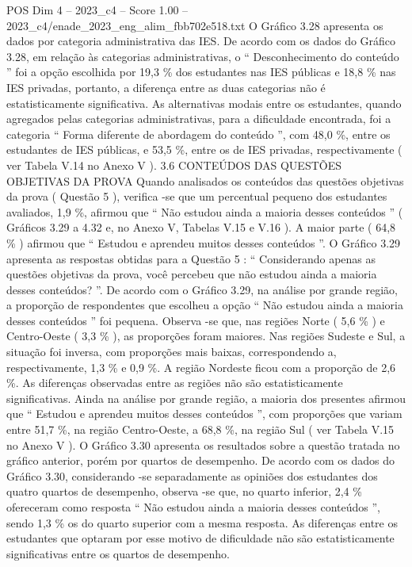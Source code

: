 \begin{textsample}{POS Dim 4 – 2023\_c4 – Score 1.00 – 2023\_c4/enade\_2023\_eng\_alim\_fbb702e518.txt}
O Gráfico 3.28 apresenta os dados por categoria administrativa das IES.
De acordo com os dados do Gráfico 3.28, em relação às categorias administrativas, o “ Desconhecimento do conteúdo ” foi a opção escolhida por 19,3 \% dos estudantes nas IES públicas e 18,8 \% nas IES privadas, portanto, a diferença entre as duas categorias não é estatisticamente significativa.
As alternativas modais entre os estudantes, quando agregados pelas categorias administrativas, para a dificuldade encontrada, foi a categoria “ Forma diferente de abordagem do conteúdo ”, com 48,0 \%, entre os estudantes de IES públicas, e 53,5 \%, entre os de IES privadas, respectivamente ( ver Tabela V.14 no Anexo V ). 3.6 CONTEÚDOS DAS QUESTÕES OBJETIVAS DA PROVA Quando analisados os conteúdos das questões objetivas da prova ( Questão 5 ), verifica -se que um percentual pequeno dos estudantes avaliados, 1,9 \%, afirmou que “ Não estudou ainda a maioria desses conteúdos ” ( Gráficos 3.29 a 4.32 e, no Anexo V, Tabelas V.15 e V.16 ).
A maior parte ( 64,8 \% ) afirmou que “ Estudou e aprendeu muitos desses conteúdos ”.
O Gráfico 3.29 apresenta as respostas obtidas para a Questão 5 : “ Considerando apenas as questões objetivas da prova, você percebeu que não estudou ainda a maioria desses conteúdos? ”.
De acordo com o Gráfico 3.29, na análise por grande região, a proporção de respondentes que escolheu a opção “ Não estudou ainda a maioria desses conteúdos ” foi pequena.
Observa -se que, nas regiões Norte ( 5,6 \% ) e Centro-Oeste ( 3,3 \% ), as proporções foram maiores.
Nas regiões Sudeste e Sul, a situação foi inversa, com proporções mais baixas, correspondendo a, respectivamente, 1,3 \% e 0,9 \%.
A região Nordeste ficou com a proporção de 2,6 \%.
As diferenças observadas entre as regiões não são estatisticamente significativas.
Ainda na análise por grande região, a maioria dos presentes afirmou que “ Estudou e aprendeu muitos desses conteúdos ”, com proporções que variam entre 51,7 \%, na região Centro-Oeste, a 68,8 \%, na região Sul ( ver Tabela V.15 no Anexo V ).
O Gráfico 3.30 apresenta os resultados sobre a questão tratada no gráfico anterior, porém por quartos de desempenho.
De acordo com os dados do Gráfico 3.30, considerando -se separadamente as opiniões dos estudantes dos quatro quartos de desempenho, observa -se que, no quarto inferior, 2,4 \% ofereceram como resposta “ Não estudou ainda a maioria desses conteúdos ”, sendo 1,3 \% os do quarto superior com a mesma resposta.
As diferenças entre os estudantes que optaram por esse motivo de dificuldade não são estatisticamente significativas entre os quartos de desempenho.

\end{textsample}
